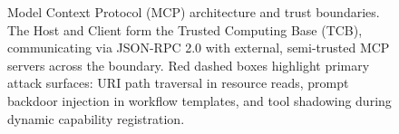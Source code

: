 \begin{figure}[t]
{%
}
\caption{Model Context Protocol (MCP) architecture and trust boundaries. The Host and Client form the Trusted Computing Base (TCB), communicating via JSON-RPC 2.0 with external, semi-trusted MCP servers across the boundary. Red dashed boxes highlight primary attack surfaces: URI path traversal in resource reads, prompt backdoor injection in workflow templates, and tool shadowing during dynamic capability registration.}
\label{fig:mcp_boundaries}
\end{figure}
